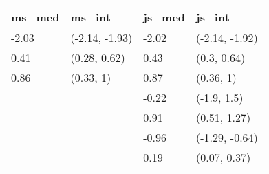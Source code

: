 
\begin{tabular}{llll}
\toprule
ms\_med & ms\_int & js\_med & js\_int\\
\midrule
-2.03 & (-2.14, -1.93) & -2.02 & (-2.14, -1.92)\\
0.41 & (0.28, 0.62) & 0.43 & (0.3, 0.64)\\
0.86 & (0.33, 1) & 0.87 & (0.36, 1)\\
 &  & -0.22 & (-1.9, 1.5)\\
 &  & 0.91 & (0.51, 1.27)\\
 &  & -0.96 & (-1.29, -0.64)\\
 &  & 0.19 & (0.07, 0.37)\\
\bottomrule
\end{tabular}
